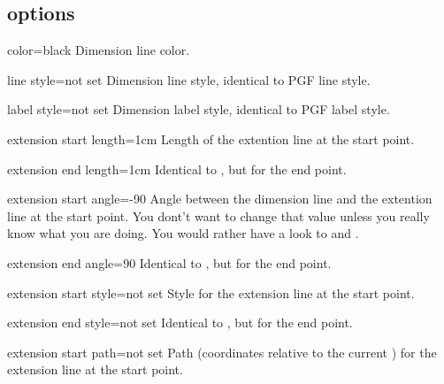 \documentclass[a4paper]{article}
\newcommand{\PGF}{\textsc{PGF}}
\begin{document}
\subsection{options}
\begin{docKey}{color}{=}{black}
  Dimension line color.
\end{docKey}
\begin{docKey}{line style}{=}{not set}
  Dimension line style, identical to {\PGF} line style.
\end{docKey}
\begin{docKey}{label style}{=}{not set}
  Dimension label style, identical to {\PGF} label style.
\end{docKey}

\begin{docKey}{extension start length}{=}{1cm}
  Length of the extention line at the start point.
\end{docKey}

\begin{docKey}{extension end length}{=}{1cm}
  Identical to , but for the end point.
\end{docKey}

\begin{docKey}{extension start angle}{=}{-90}
  Angle between the dimension line and the extention line at the start
  point.  You dont't want to change that value unless you really know what
  you are doing. You would rather have a look to  and .
\end{docKey}

\begin{docKey}{extension end angle}{=}{90}
  Identical to , but for the end point.
\end{docKey}

\begin{docKey}{extension start style}{=}{not set}
  Style for the extension line at the start point.
\end{docKey}

\begin{docKey}{extension end style}{=}{not set}
  Identical to , but for the end point.
\end{docKey}

\begin{docKey}{extension start path}{=}{not set}
  Path (coordinates relative to the current
  ) for the extension line at the start
  point.
\end{docKey}
\end{document}
